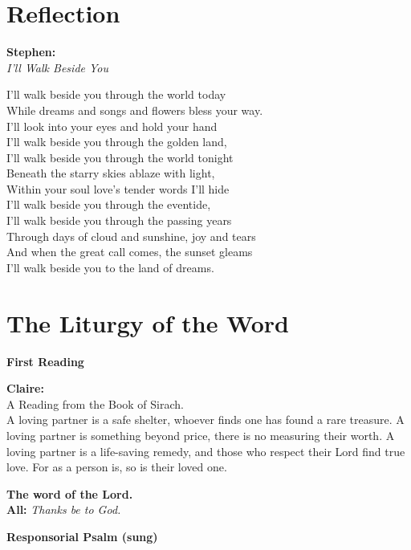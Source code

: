 \documentclass[12pt,landscape]{article}
\begin{document}
\newpage
\begin{multicols}{2}

\section*{Reflection}

\textbf{Stephen:}\\
\textit{I’ll Walk Beside You}

I’ll walk beside you through the world today\\
While dreams and songs and flowers bless your way.\\
I’ll look into your eyes and hold your hand\\
I’ll walk beside you through the golden land,\\

I’ll walk beside you through the world tonight\\
Beneath the starry skies ablaze with light,\\
Within your soul love’s tender words I’ll hide\\
I’ll walk beside you through the eventide,\\

I’ll walk beside you through the passing years\\
Through days of cloud and sunshine, joy and tears\\
And when the great call comes, the sunset gleams\\
I’ll walk beside you to the land of dreams.

\columnbreak

\section*{The Liturgy of the Word}

\textbf{First Reading}

\textbf{Claire:}\\
A Reading from the Book of Sirach.\\
A loving partner is a safe shelter, whoever finds one has found a rare treasure. A loving partner is something beyond price, there is no measuring their worth. A loving partner is a life-saving remedy, and those who respect their Lord find true love. For as a person is, so is their loved one.

\textbf{The word of the Lord.}\\
\textbf{All:} \textit{Thanks be to God.}

\vspace{1em}

\textbf{Responsorial Psalm (sung)}

\end{multicols}
\end{document}
